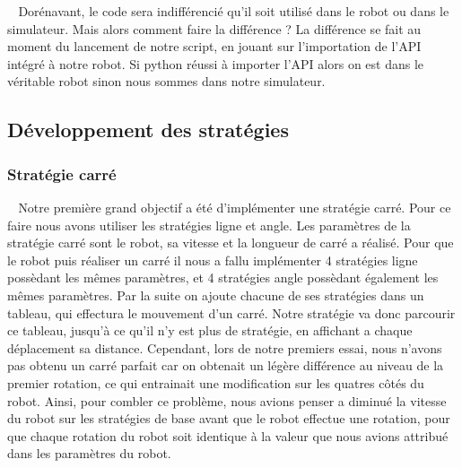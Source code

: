 \documentclass[12pt]{article}
\def\tab{$\>\>\>\>$}
\begin{document}
\tab Dorénavant, le code sera indifférencié qu'il soit utilisé dans le robot ou dans le simulateur. Mais alors comment faire la différence ? La différence se fait au moment du lancement de notre script, en jouant sur l'importation de l'API intégré à notre robot. Si python réussi à importer l'API alors on est dans le véritable robot sinon nous sommes dans notre simulateur.


\newpage
\subsection{Développement des stratégies}
\subsubsection{Stratégie carré}
\tab Notre première grand objectif a été d'implémenter une stratégie carré. Pour ce faire nous avons utiliser les stratégies ligne et angle. Les paramètres de la stratégie carré sont le robot, sa vitesse et la longueur de carré a réalisé. Pour que le robot puis réaliser un carré il nous a fallu implémenter 4 stratégies ligne possèdant les mêmes paramètres, et 4 stratégies angle possèdant également les mêmes paramètres. Par la suite on ajoute chacune de ses stratégies dans un tableau, qui effectura le mouvement d'un carré. Notre stratégie va donc parcourir ce tableau, jusqu'à ce qu'il n'y est plus de stratégie, en affichant a chaque déplacement sa distance. Cependant, lors de notre premiers essai, nous n'avons pas obtenu un carré parfait car on obtenait un légère différence au niveau de la premier rotation, ce qui entrainait une modification sur les quatres côtés du robot. Ainsi, pour combler ce problème, nous avions penser a diminué la vitesse du robot sur les stratégies de base avant que le robot effectue une rotation, pour que chaque rotation du robot soit identique à la valeur que nous avions attribué dans les paramètres du robot.
\end{document}
